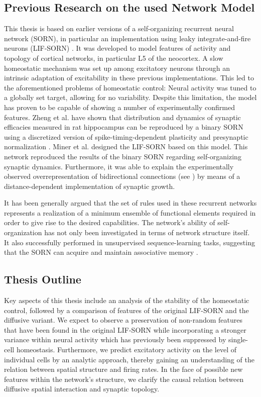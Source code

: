 \documentclass[10pt,a4paper]{article}
\begin{document}
\subsection{Previous Research on the used Network Model}
This thesis is based on earlier versions of a self-organizing recurrent neural network (SORN), in particular an implementation using leaky integrate-and-fire neurons (LIF-SORN) \cite{SORN_Paper}. It was developed to model features of activity and topology of cortical networks, in particular L5 of the neocortex. A slow homeostatic mechanism was set up among excitatory neurons through an intrinsic adaptation of excitability in these previous implementations. This led to the aforementioned problems of homeostatic control: Neural activity was tuned to a globally set target, allowing for no variability. Despite this limitation, the model has proven to be capable of showing a number of experimentally confirmed features. Zheng et al. have shown that distribution and dynamics of synaptic efficacies measured in rat hippocampus can be reproduced by a binary SORN using a discretized version of spike-timing-dependent plasticity and presynaptic normalization \cite{Pengsheng_2013}. Miner et al. designed the LIF-SORN based on this model. This network reproduced the results of the binary SORN regarding self-organizing synaptic dynamics. Furthermore, it was able to explain the experimentally observed overrepresentation of bidirectional connections (see \cite{Markram_Connections_1997,Song_Connectivity_2005}) by means of a distance-dependent implementation of synaptic growth.

It has been generally argued that the set of rules used in these recurrent networks represents a realization of a minimum ensemble of functional elements required in order to give rise to the desired capabilities. The network's ability of self-organization has not only been investigated in terms of network structure itself. It also successfully performed in unsupervised sequence-learning tasks, suggesting that the SORN can acquire and maintain associative memory \cite{Hartmann_2016}.  

 
\subsection{Thesis Outline}
Key aspects of this thesis include an analysis of the stability of the homeostatic control, followed by a comparison of features of the original LIF-SORN and the diffusive variant. We expect to observe a preservation of non-random features that have been found in the original LIF-SORN while incorporating a stronger variance within neural activity which has previously been suppressed by single-cell homeostasis. Furthermore, we predict excitatory activity on the level of individual cells by an analytic approach, thereby gaining an understanding of the relation between spatial structure and firing rates. In the face of possible new features within the network's structure, we clarify the causal relation between diffusive spatial interaction and synaptic topology.
\end{document}
